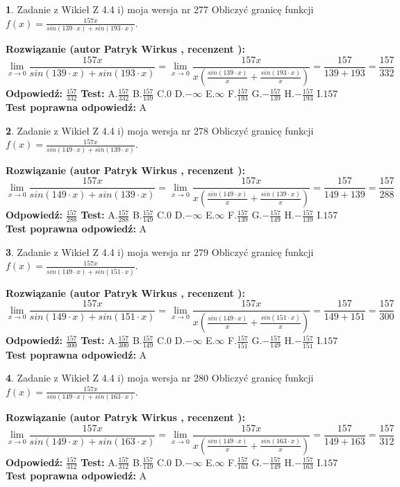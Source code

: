 \documentclass[12pt, a4paper]{article}
\theoremstyle{definition} %
\newtheorem{zad}{}
\newcommand{\zadStart}[1]{\begin{zad}#1\newline}
\newcommand{\zadStop}{\end{zad}}
\newcommand{\rozwStart}[2]{\noindent \textbf{Rozwiązanie (autor #1 , recenzent #2): }\newline}
\newcommand{\rozwStop}{\newline}
\newcommand{\odpStart}{\noindent \textbf{Odpowiedź:}\newline}
\newcommand{\odpStop}{\newline}
\newcommand{\testStart}{\noindent \textbf{Test:}\newline}
\newcommand{\testStop}{\newline}
\newcommand{\kluczStart}{\noindent \textbf{Test poprawna odpowiedź:}\newline}
\newcommand{\kluczStop}{\newline}
\begin{document}
\zadStart{Zadanie z Wikieł Z 4.4 i) moja wersja nr 277}
Obliczyć granicę funkcji $f(x)=\frac{157x}{sin(139\cdot x) +sin(193\cdot x)}$.
\zadStop
\rozwStart{Patryk Wirkus}{}
$$\lim\limits_{x\to 0}\frac{157x}{sin(139\cdot x) +sin(193\cdot x)}=\lim\limits_{x\to 0}\frac{157x}{x(\frac{sin(139\cdot x)}{x}+\frac{sin(193\cdot x)}{x})}=\frac{157}{139+193} = \frac{157}{332}$$
\rozwStop
\odpStart
$\frac{157}{332}$
\odpStop
\testStart
A.$\frac{157}{332}$
B.$\frac{157}{139}$
C.$0$
D.$-\infty$
E.$\infty$
F.$\frac{157}{193}$
G.$-\frac{157}{139}$
H.$-\frac{157}{193}$
I.$157$
\testStop
\kluczStart
A
\kluczStop



\zadStart{Zadanie z Wikieł Z 4.4 i) moja wersja nr 278}
Obliczyć granicę funkcji $f(x)=\frac{157x}{sin(149\cdot x) +sin(139\cdot x)}$.
\zadStop
\rozwStart{Patryk Wirkus}{}
$$\lim\limits_{x\to 0}\frac{157x}{sin(149\cdot x) +sin(139\cdot x)}=\lim\limits_{x\to 0}\frac{157x}{x(\frac{sin(149\cdot x)}{x}+\frac{sin(139\cdot x)}{x})}=\frac{157}{149+139} = \frac{157}{288}$$
\rozwStop
\odpStart
$\frac{157}{288}$
\odpStop
\testStart
A.$\frac{157}{288}$
B.$\frac{157}{149}$
C.$0$
D.$-\infty$
E.$\infty$
F.$\frac{157}{139}$
G.$-\frac{157}{149}$
H.$-\frac{157}{139}$
I.$157$
\testStop
\kluczStart
A
\kluczStop



\zadStart{Zadanie z Wikieł Z 4.4 i) moja wersja nr 279}
Obliczyć granicę funkcji $f(x)=\frac{157x}{sin(149\cdot x) +sin(151\cdot x)}$.
\zadStop
\rozwStart{Patryk Wirkus}{}
$$\lim\limits_{x\to 0}\frac{157x}{sin(149\cdot x) +sin(151\cdot x)}=\lim\limits_{x\to 0}\frac{157x}{x(\frac{sin(149\cdot x)}{x}+\frac{sin(151\cdot x)}{x})}=\frac{157}{149+151} = \frac{157}{300}$$
\rozwStop
\odpStart
$\frac{157}{300}$
\odpStop
\testStart
A.$\frac{157}{300}$
B.$\frac{157}{149}$
C.$0$
D.$-\infty$
E.$\infty$
F.$\frac{157}{151}$
G.$-\frac{157}{149}$
H.$-\frac{157}{151}$
I.$157$
\testStop
\kluczStart
A
\kluczStop



\zadStart{Zadanie z Wikieł Z 4.4 i) moja wersja nr 280}
Obliczyć granicę funkcji $f(x)=\frac{157x}{sin(149\cdot x) +sin(163\cdot x)}$.
\zadStop
\rozwStart{Patryk Wirkus}{}
$$\lim\limits_{x\to 0}\frac{157x}{sin(149\cdot x) +sin(163\cdot x)}=\lim\limits_{x\to 0}\frac{157x}{x(\frac{sin(149\cdot x)}{x}+\frac{sin(163\cdot x)}{x})}=\frac{157}{149+163} = \frac{157}{312}$$
\rozwStop
\odpStart
$\frac{157}{312}$
\odpStop
\testStart
A.$\frac{157}{312}$
B.$\frac{157}{149}$
C.$0$
D.$-\infty$
E.$\infty$
F.$\frac{157}{163}$
G.$-\frac{157}{149}$
H.$-\frac{157}{163}$
I.$157$
\testStop
\kluczStart
A
\kluczStop
\end{document}

